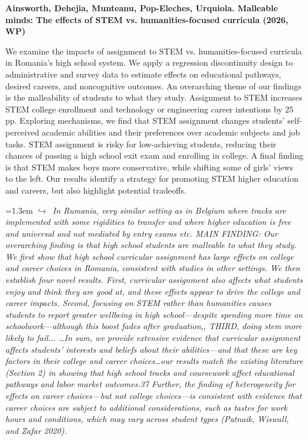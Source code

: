 \documentclass[11pt]{article}
\newcommand{\entry}[3]{%
  \par\medskip\noindent\textbf{#1}\par
  \nopagebreak #2\hspace{0.35em}{\small\color{tagcol}[#3]}\par}
\newcommand{\note}[1]{\par\smallskip\noindent\hangindent=1.3em
  \textcolor{notecol}{\footnotesize$\hookrightarrow$~\textit{#1}}}
\begin{document}
\entry{Ainsworth, Dehejia, Munteanu, Pop-Eleches, Urquiola. Malleable minds: The effects of STEM vs. humanities-focused curricula (2026, WP)}
{We examine the impacts of assignment to STEM vs. humanities-focused curricula in Romania’s high school system. We apply a regression discontinuity design to administrative and survey data to estimate effects on educational pathways, desired careers, and noncognitive outcomes. An overarching theme of our findings is the malleability of students to what they study. Assignment to STEM increases STEM college enrollment and technology or engineering career intentions by 25 pp. Exploring mechanisms, we find that STEM assignment changes students’ self-perceived academic abilities and their preferences over academic subjects and job tasks. STEM assignment is risky for low-achieving students, reducing their chances of passing a high school exit exam and enrolling in college. A final finding is that STEM makes boys more conservative, while shifting some of girls’ views to the left. Our results identify a strategy for promoting STEM higher education and careers, but also highlight potential tradeoffs.}{REV}
\note{In Rumania, very similar setting as in Belgium where tracks are implemented with some rigidities to transfer and where higher education is free and universal and not mediated by entry exams etc. MAIN FINDING: Our overarching finding is that high school students are malleable to what they study. We first show that high school curricular assignment has large effects on college and career choices in Romania, consistent with studies in other settings. We then establish four novel results. First, curricular assignment also affects what students enjoy and think they are good at, and these effects appear to drive the college and career impacts. Second, focusing on STEM rather than humanities causes students to report greater wellbeing in high school—despite spending more time on schoolwork—although this boost fades after graduation,, THIRD, doing stem more likely to fail... \dots In sum, we provide extensive evidence that curricular assignment affects students’ interests and beliefs about their abilities—and that these are key factors in their college and career choices\dots our results match the existing literature (Section 2) in showing that high school tracks and coursework affect educational pathways and labor market outcomes.37 Further, the finding of heterogeneity for effects on career choices—but not college choices—is consistent with evidence that career choices are subject to additional considerations, such as tastes for work hours and conditions, which may vary across student types (Patnaik, Wiswall, and Zafar 2020).}
\end{document}
